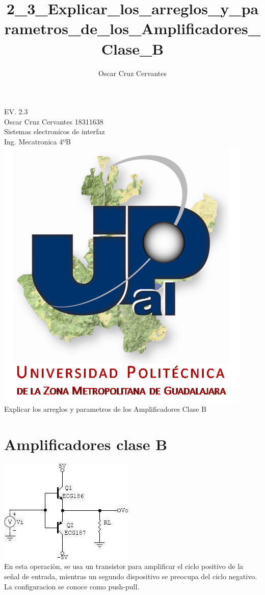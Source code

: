 \documentclass[12pt,a4paper]{report}
\author{Oscar Cruz Cervantes}
\title{2_3_Explicar_los_arreglos_y_parametros_de_los_Amplificadores_Clase_B}
\begin{document}
\begin{center}
EV. 2.3\\

Oscar Cruz Cervantes 18311638\\
Sistemas electronicos de interfaz\\
Ing. Mecatronica 4ºB\\

\includegraphics[scale=1.5]{01.png}\\
Explicar los arreglos y parametros de los Amplificadores Clase B
\end{center}
\newpage
\section{Amplificadores clase B}
\begin{center}
\includegraphics[scale=1]{01.jpg}\\
En esta operaciòn, se usa un transistor para amplificar el ciclo positivo de la señal de entrada, mientras un segundo dispositivo se preocupa del ciclo negativo. La configuracion se conoce como push-pull.
\end{center}
\end{document}
